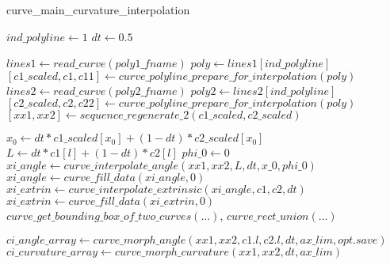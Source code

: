 
\begin{algorithm}[hbt!]
	\caption{curve\_main\_curvature\_interpolation}
	
	$ind\_polyline \leftarrow 1$ 
	$dt \leftarrow 0.5$ 
	
	$lines1 \leftarrow read\_curve(poly1\_fname)$ 
	$poly \leftarrow lines1[ind\_polyline]$\;
	$[c1\_scaled, c1, c11] \leftarrow curve\_polyline\_prepare\_for\_interpolation(poly)$ 
	$lines2 \leftarrow read\_curve(poly2\_fname)$ 
	$poly2 \leftarrow lines2[ind\_polyline]$\;
	$[c2\_scaled, c2, c22] \leftarrow curve\_polyline\_prepare\_for\_interpolation(poly)$ 
	$[xx1,xx2] \leftarrow sequence\_regenerate\_2(c1\_scaled,c2\_scaled)$ 
	
	$x_0 \leftarrow dt*c1\_scaled[x_0]+(1-dt)*c2\_scaled[x_0]$\;
	$L \leftarrow dt*c1[l]+(1-dt)*c2[l]$\;
	$phi\_0 \leftarrow 0$\;
	$xi\_angle \leftarrow curve\_interpolate\_angle(xx1, xx2, L, dt, x\_0, phi\_0)$\;
	$xi\_angle \leftarrow curve\_fill\_data(xi\_angle, 0)$ 
	$xi\_extrin \leftarrow curve\_interpolate\_extrinsic(xi\_angle, c1, c2, dt)$\;
	$xi\_extrin \leftarrow curve\_fill\_data(xi\_extrin, 0)$ 
	$curve\_get\_bounding\_box\_of\_two\_curves(...)$, $curve\_rect\_union(...)$ 
	
	$ci\_angle\_array \leftarrow curve\_morph\_angle(xx1, xx2, c1.l, c2.l, dt, ax\_lim, opt.save)$ 
	$ci\_curvature\_array \leftarrow curve\_morph\_curvature(xx1, xx2, dt, ax\_lim)$  
	
\end{algorithm}

